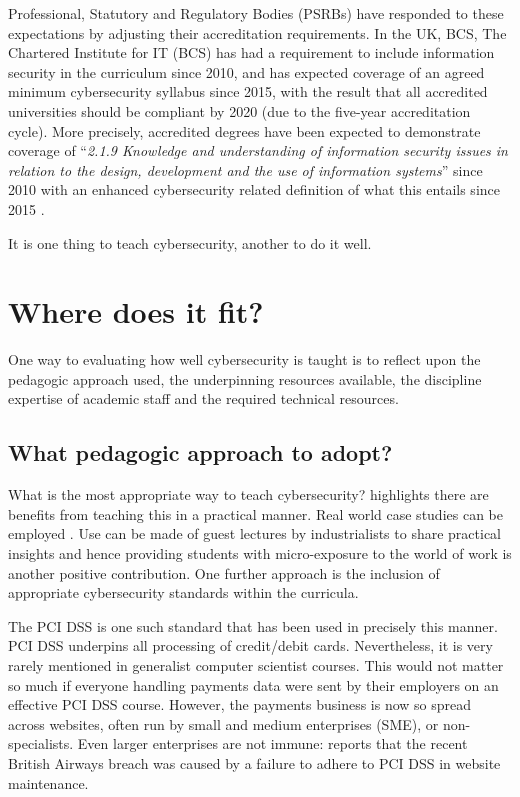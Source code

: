 \documentclass[sigconf]{acmart}
\begin{document}
Professional, Statutory and Regulatory Bodies (PSRBs) have responded to these expectations by adjusting their accreditation requirements. In the UK, BCS, The Chartered Institute for IT (BCS) has had a requirement to include information security in the curriculum since 2010, and has expected coverage of an agreed minimum cybersecurity syllabus since 2015, with the result that all accredited universities should be compliant by 2020 (due to the five-year accreditation cycle). More precisely, accredited degrees have been expected to demonstrate coverage of ``{\emph{2.1.9 Knowledge and understanding of information security issues in relation to the design, development and the use of information systems}}'' \cite[p.~30]{BCS2018a} since 2010 with an enhanced cybersecurity related definition of what this entails since 2015 \cite[p.~17--18]{BCS2018a}.

It is one thing to teach cybersecurity, another to do it well. %

\section {Where does it fit?	}


One way to evaluating how well cybersecurity is taught is to reflect upon the pedagogic approach used, the underpinning resources available, the discipline expertise of academic staff and the required technical resources.

\subsection{What pedagogic approach to adopt? }
What is the most appropriate way to teach cybersecurity? \cite{Weiss:2013:THC:2527148.2527180} highlights there are benefits from teaching this in a practical manner. Real world case studies can be employed \cite{BritishAirways2018a}. Use can be made of guest lectures by industrialists to share practical insights and hence providing students with micro-exposure to the world of work is another positive contribution. One further approach is the inclusion of appropriate cybersecurity standards within the curricula.

The PCI DSS \cite{PCI2018b} is one such standard that has been used in precisely this manner. PCI DSS underpins all processing of credit/debit cards. Nevertheless, it is very rarely mentioned in generalist computer scientist courses. This would not matter so much if everyone handling payments data were sent by their employers on an effective PCI DSS course. However, the payments business is now so spread across websites, often run by small and medium enterprises (SME), or non-specialists. Even larger enterprises are not immune: \cite{BritishAirways2018a} reports that the recent British Airways breach was caused by a failure to adhere to PCI DSS in website maintenance.
\end{document}
